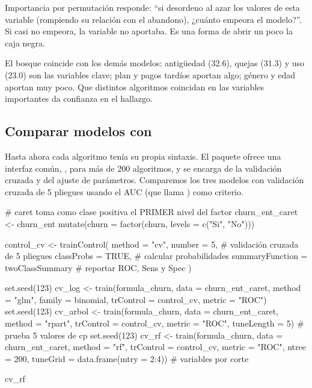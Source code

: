 \begin{concepto}{Importancia por permutación}
 responde: ``si desordeno al azar los valores de
esta variable (rompiendo su relación con el abandono), ¿cuánto empeora el
modelo?''. Si casi no empeora, la variable no aportaba. Es una forma de abrir
un poco la caja negra.
\end{concepto}

El bosque coincide con los demás modelos: antigüedad (32.6), quejas (31.3) y
uso (23.0) son las variables clave; plan y pagos tardíos aportan algo; género y
edad aportan muy poco. Que distintos algoritmos coincidan en las variables
importantes da confianza en el hallazgo.

\subsection{Comparar modelos con \texorpdfstring{}{caret}}

Hasta ahora cada algoritmo tenía su propia sintaxis. El paquete
 ofrece una interfaz común, , para más de 200
algoritmos, y se encarga de la validación cruzada y del ajuste de parámetros.
Comparemos los tres modelos con validación cruzada de 5 pliegues usando el AUC
(que  llama ) como criterio.

\begin{rcode}
# caret toma como clase positiva el PRIMER nivel del factor
churn_ent_caret <- churn_ent %
  mutate(churn = factor(churn, levels = c("Si", "No")))

control_cv <- trainControl(
  method = "cv", number = 5,           # validación cruzada de 5 pliegues
  classProbs = TRUE,                   # calcular probabilidades
  summaryFunction = twoClassSummary    # reportar ROC, Sens y Spec
)

set.seed(123)
cv_log <- train(formula_churn, data = churn_ent_caret, method = "glm",
                family = binomial, trControl = control_cv, metric = "ROC")
set.seed(123)
cv_arbol <- train(formula_churn, data = churn_ent_caret,
                  method = "rpart", trControl = control_cv,
                  metric = "ROC", tuneLength = 5)   # prueba 5 valores de cp
set.seed(123)
cv_rf <- train(formula_churn, data = churn_ent_caret, method = "rf",
               trControl = control_cv, metric = "ROC", ntree = 200,
               tuneGrid = data.frame(mtry = 2:4))   # variables por corte

cv_rf
\end{rcode}

